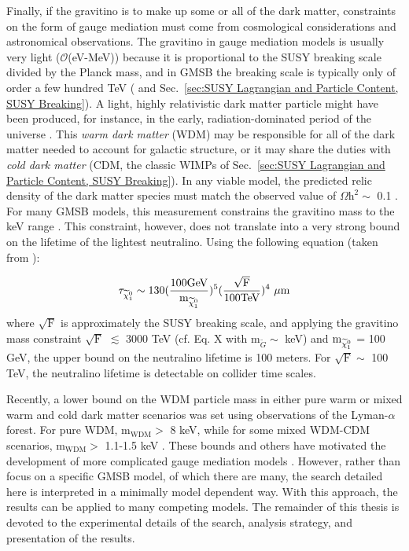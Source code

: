 \documentclass[dissertation.tex]{subfiles}
\begin{document}
Finally, if the gravitino is to make up some or all of the dark matter, constraints on the form of gauge mediation must come from cosmological considerations and astronomical observations.  The gravitino in gauge mediation models is usually very light ($\mathcal{O}$(eV-MeV)) because it is proportional to the SUSY breaking scale divided by the Planck mass, and in GMSB the breaking scale is typically only of order a few hundred TeV (\cite{SUSY_primer} and Sec.~\ref{sec:SUSY Lagrangian and Particle Content, SUSY Breaking}).  A light, highly relativistic dark matter particle might have been produced, for instance, in the early, radiation-dominated period of the universe \cite{Lyman_alpha_DM_limits}.  This \textit{warm dark matter} (WDM) may be responsible for all of the dark matter needed to account for galactic structure, or it may share the duties with \textit{cold dark matter} (CDM, the classic WIMPs of Sec.~\ref{sec:SUSY Lagrangian and Particle Content, SUSY Breaking}).  In any viable model, the predicted relic density of the dark matter species must match the observed value of $\Omega \mbox{h}^{2} \sim$ 0.1 \cite{WMAP}.  For many GMSB models, this measurement constrains the gravitino mass to the keV range \cite{long_lived_neutralinos_at_the_Tevatron}.  This constraint, however, does not translate into a very strong bound on the lifetime of the lightest neutralino.  Using the following equation (taken from \cite{long_lived_neutralinos_at_the_Tevatron}):

\begin{equation}
\tau_{\widetilde{\chi}_{1}^{0}} \sim 130(\frac{100 \mbox{GeV}}{\mbox{m}_{\widetilde{\chi}_{1}^{0}}})^{5}(\frac{\sqrt{\mbox{F}}}{100 \mbox{TeV}})^{4}\mbox{ }\mu \mbox{m}
\end{equation}
%
where $\sqrt{\mbox{F}}$ is approximately the SUSY breaking scale, and applying the gravitino mass constraint $\sqrt{\mbox{F}}$ $\lesssim$ 3000 TeV (cf. Eq. X with $\mbox{m}_{\widetilde{G}} \sim$ keV) and $\mbox{m}_{\widetilde{\chi}_{1}^{0}}$ = 100 GeV, the upper bound on the neutralino lifetime is 100 meters.  For $\sqrt{\mbox{F}} \sim$ 100 TeV, the neutralino lifetime is detectable on collider time scales.

Recently, a lower bound on the WDM particle mass in either pure warm or mixed warm and cold dark matter scenarios was set using observations of the Lyman-$\alpha$ forest.  For pure WDM, $\mbox{m}_{\mathrm{WDM}} >$ 8 keV, while for some mixed WDM-CDM scenarios, $\mbox{m}_{\mathrm{WDM}} >$ 1.1-1.5 keV \cite{Lyman_alpha_DM_limits, cosmo_constraints_on_GMSB}.  These bounds and others have motivated the development of more complicated gauge mediation models \cite{cosmo_constraints_on_GMSB}.  However, rather than focus on a specific GMSB model, of which there are many, the search detailed here is interpreted in a minimally model dependent way.  With this approach, the results can be applied to many competing models.  The remainder of this thesis is devoted to the experimental details of the search, analysis strategy, and presentation of the results.
\end{document}
